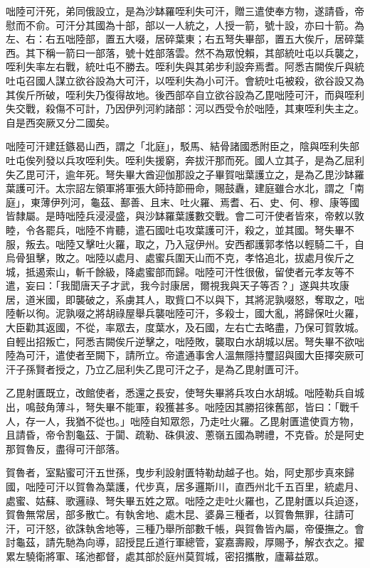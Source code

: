 \begin{pinyinscope}
 咄陸可汗死，弟同俄設立，是為沙缽羅咥利失可汗，贈三遣使奉方物，遂請昏，帝慰而不俞。可汗分其國為十部，部以一人統之，人授一箭，號十設，亦曰十箭。為左、右：右五咄陸部，置五大啜，居碎葉東；右五弩失畢部，置五大俟斤，居碎葉西。其下稱一箭曰一部落，號十姓部落雲。然不為眾悅賴，其部統吐屯以兵襲之，咥利失率左右戰，統吐屯不勝去。咥利失與其弟步利設奔焉耆。阿悉吉闕俟斤與統吐屯召國人謀立欲谷設為大可汗，以咥利失為小可汗。會統吐屯被殺，欲谷設又為其俟斤所破，咥利失乃復得故地。後西部卒自立欲谷設為乙毘咄陸可汗，而與咥利失交戰，殺傷不可計，乃因伊列河約諸部：河以西受令於咄陸，其東咥利失主之。自是西突厥又分二國矣。



 咄陸可汗建廷鏃曷山西，謂之「北庭」，駁馬、結骨諸國悉附臣之，陰與咥利失部吐屯俟列發以兵攻咥利失。咥利失援窮，奔拔汗那而死。國人立其子，是為乙屈利失乙毘可汗，逾年死。弩失畢大酋迎伽那設之子畢賀咄葉護立之，是為乙毘沙缽羅葉護可汗。太宗詔左領軍將軍張大師持節冊命，賜鼓纛，建庭雖合水北，謂之「南庭」，東薄伊列河，龜茲、鄯善、且末、吐火羅、焉耆、石、史、何、穆、康等國皆隸屬。是時咄陸兵浸浸盛，與沙缽羅葉護數交戰。會二可汗使者皆來，帝敕以敦睦，令各罷兵，咄陸不肯聽，遣石國吐屯攻葉護可汗，殺之，並其國。弩失畢不服，叛去。咄陸又擊吐火羅，取之，乃入寇伊州。安西都護郭孝恪以輕騎二千，自烏骨狙擊，敗之。咄陸以處月、處蜜兵圍天山而不克，孝恪追北，拔處月俟斤之城，抵遏索山，斬千餘級，降處蜜部而歸。咄陸可汗性很傲，留使者元孝友等不遣，妄曰：「我聞唐天子才武，我今討康居，爾視我與天子等否？」遂與共攻康居，道米國，即襲破之，系虜其人，取貲口不以與下，其將泥孰啜怒，奪取之，咄陸斬以徇。泥孰啜之將胡祿屋舉兵襲咄陸可汗，多殺士，國大亂，將歸保吐火羅，大臣勸其返國，不從，率眾去，度葉水，及石國，左右亡去略盡，乃保可賀敦城。自輕出招叛亡，阿悉吉闕俟斤逆擊之，咄陸敗，襲取白水胡城以居。弩失畢不欲咄陸為可汗，遣使者至闕下，請所立。帝遣通事舍人溫無隱持璽詔與國大臣擇突厥可汗子孫賢者授之，乃立乙屈利失乙毘可汗之子，是為乙毘射匱可汗。



 乙毘射匱既立，改館使者，悉還之長安，使弩失畢將兵攻白水胡城。咄陸勒兵自城出，鳴鼓角薄斗，弩失畢不能軍，殺獲甚多。咄陸因其勝招徠舊部，皆曰：「戰千人，存一人，我猶不從也。」咄陸自知眾怨，乃走吐火羅。乙毘射匱遣使貢方物，且請昏，帝令割龜茲、于闐、疏勒、硃俱波、蔥嶺五國為聘禮，不克昏。於是阿史那賀魯反，盡得可汗部落。



 賀魯者，室點蜜可汗五世孫，曳步利設射匱特勒劫越子也。始，阿史那步真來歸國，咄陸可汗以賀魯為葉護，代步真，居多邏斯川，直西州北千五百里，統處月、處蜜、姑蘇、歌邏祿、弩失畢五姓之眾。咄陸之走吐火羅也，乙毘射匱以兵迫逐，賀魯無常居，部多散亡。有執舍地、處木昆、婆鼻三種者，以賀魯無罪，往請可汗，可汗怒，欲誅執舍地等，三種乃舉所部數千帳，與賀魯皆內屬，帝優撫之。會討龜茲，請先馳為向導，詔授昆丘道行軍總管，宴嘉壽殿，厚賜予，解衣衣之。擢累左驍衛將軍、瑤池都督，處其部於庭州莫賀城，密招攜散，廬幕益眾。




\end{pinyinscope}
